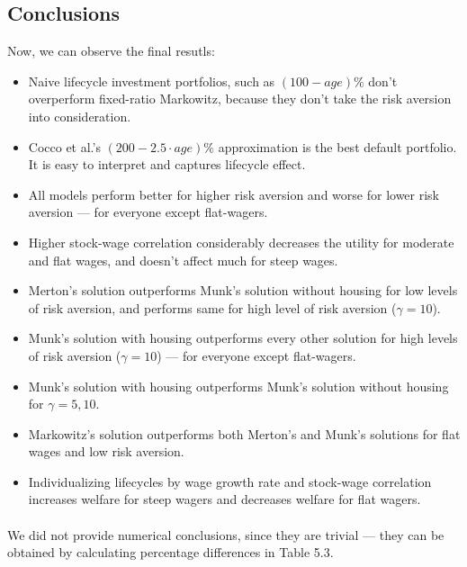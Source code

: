 \resetgeometry

\subsection{Conclusions}
Now, we can observe the final resutls:

\begin{itemize}

\item Naive lifecycle investment portfolios, such as $(100-age)\%$ don't overperform fixed-ratio Markowitz, because they don't take the risk aversion into consideration.
\item Cocco et al.'s $(200-2.5\cdot age)\%$ approximation is the best default portfolio. It is easy to interpret and captures lifecycle effect.
\item All models perform better for higher risk aversion and worse for lower risk aversion --- for everyone except flat-wagers.
\item Higher stock-wage correlation considerably decreases the utility for moderate and flat wages, and doesn't affect much for steep wages.
\item Merton's solution outperforms Munk's solution without housing for low levels of risk aversion, and performs same for high level of risk aversion ($\gamma=10$).
\item Munk's solution with housing outperforms every other solution for high levels of risk aversion ($\gamma=10$) --- for everyone except flat-wagers.
\item Munk's solution with housing outperforms Munk's solution without housing for $\gamma=5,10$.
\item Markowitz's solution outperforms both Merton's and Munk's solutions for flat wages and low risk aversion.
\item Individualizing lifecycles by wage growth rate and stock-wage correlation increases welfare for steep wagers and decreases welfare for flat wagers.
\end{itemize}

\paragraph{}We did not provide numerical conclusions, since they are trivial --- they can be obtained by calculating percentage differences in Table 5.3.

